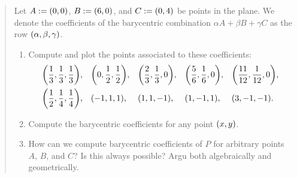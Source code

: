\documentclass[english]{exercise}
\begin{document}
	\begin{quote}
		Let \(A := \parentheses*{0, 0}\), \(B := \parentheses*{6, 0}\), and \(C := \parentheses*{0, 4}\) be points in the plane.
		We denote the coefficients of the barycentric combination \(\alpha A + \beta B + \gamma C\) as the row \(\parentheses*{\alpha, \beta, \gamma}\).
		\begin{enumerate}
			\item Compute and plot the points associated to these coefficients:
			\begin{align*}
				&\parentheses*{\frac{1}{3}, \frac{1}{3}, \frac{1}{3}}, && \parentheses*{0, \frac{1}{2}, \frac{1}{2}}, && \parentheses*{\frac{2}{3}, \frac{1}{3}, 0}, && \parentheses*{\frac{5}{6}, \frac{1}{6}, 0}, && \parentheses*{\frac{11}{12}, \frac{1}{12}, 0},\\
				&\parentheses*{\frac{1}{2}, \frac{1}{4}, \frac{1}{4}}, && \parentheses*{-1, 1, 1}, && \parentheses*{1, 1, -1}, && \parentheses*{1, -1, 1}, && \parentheses*{3, -1, -1}.
			\end{align*}
			\item Compute the barycentric coefficients for any point \(\parentheses*{x, y}\).
			\item How can we compute barycentric coefficients of \(P\) for arbitrary points \(A\), \(B\), and \(C\)?
			Is this always possible?
			Argu both algebraically and geometrically.
		\end{enumerate}
	\end{quote}
\end{document}
